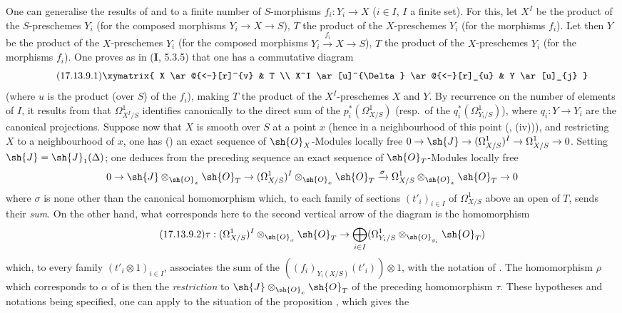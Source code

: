 \begin{env}[17.13.9]
\label{IV.17.13.9}
One can generalise the results of  and  to a finite number of $S$-morphisms $f_i:Y_i\to X$ ($i\in I$, $I$ a finite set).
For this, let $X^I$ be the product of the $S$-preschemes $Y_i$ (for the composed morphisms $Y_i\to X\to S$), $T$ the product of the $X$-preschemes $Y_i$ (for the morphisms $f_i$).
Let then $Y$ be the product of the $X$-preschemes $Y_i$ (for the composed morphisms $Y_i\xrightarrow{f_i}X\to S$), $T$ the product of the $X$-preschemes $Y_i$ (for the morphisms $f_i$).
One proves as in (\textbf{I}, 5.3.5) that one has a commutative diagram
\[
\label{IV.17.13.9.1}
\tag{17.13.9.1}
\xymatrix{
  X \ar@{<-}[r]^{v} & T \\
  X^I \ar[u]^{\Delta} \ar@{<-}[r]_{u} & Y \ar[u]_{j}
}
\]
(where $u$ is the product (over $S$) of the $f_i$), making $T$ the product of the $X^I$-preschemes $X$ and $Y$.
By recurrence on the number of elements of $I$, it results from  that $\Omega^1_{X^I/S}$ identifies canonically to the direct sum of the $p_i^*(\Omega^1_{X/S})$ (resp.\ of the $q_i^*(\Omega^1_{Y_i/S})$), where $q_i:Y\to Y_i$ are the canonical projections.
Suppose now that $X$ is smooth over $S$ at a point $x$ (hence in a neighbourhood of this point (, (iv))), and restricting $X$ to a neighbourhood of $x$, one has () an exact sequence of $\sh{O}_X$-Modules locally free
$0 \to \sh{J} \to (\Omega^1_{X/S})^I \to \Omega^1_{X/S} \to 0$.
Setting $\sh{J}=\sh{J}_1(\Delta)$; one deduces from the preceding sequence an exact sequence of $\sh{O}_T$-Modules locally free
\[
  0 \to \sh{J}\otimes_{\sh{O}_x}\sh{O}_T \to (\Omega^1_{X/S})^I\otimes_{\sh{O}_x}\sh{O}_T \xrightarrow{\sigma} \Omega^1_{X/S}\otimes_{\sh{O}_x}\sh{O}_T \to 0
\]
where $\sigma$ is none other than the canonical homomorphism which, to each family of sections $(t'_i)_{i\in I}$ of $\Omega^1_{X/S}$ above an open of $T$, sends their \emph{sum}.
On the other hand, what corresponds here to the second vertical arrow of the diagram  is the homomorphism
\[
\label{IV.17.13.9.2}
\tag{17.13.9.2}
\tau: (\Omega^1_{X/S})^I\otimes_{\sh{O}_x}\sh{O}_T \to \bigoplus_{i\in I}(\Omega^1_{Y_i/S}\otimes_{\sh{O}_{y_i}}\sh{O}_T)
\]
which, to every family $(t'_i\otimes 1)_{i\in I}$, associates the sum of the $((f_i)_{Y_i(X/S)}(t'_i))\otimes 1$, with the notation of .
The homomorphism $\rho$ which corresponds to $\alpha$ of  is then the \emph{restriction} to $\sh{J}\otimes_{\sh{O}_x}\sh{O}_T$ of the preceding homomorphism $\tau$.
These hypotheses and notations being specified, one can apply to the situation of  the proposition , which gives the
\end{env}

